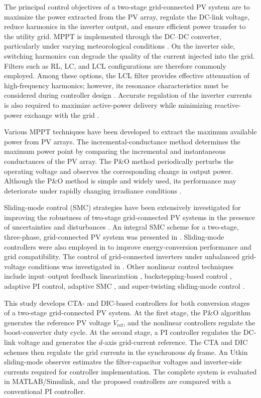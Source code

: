 \documentclass[preprint,12pt]{elsarticle}
\begin{document}
The principal control objectives of a two-stage grid-connected PV system are to maximize the power extracted from the PV array, regulate the DC-link voltage, reduce harmonics in the inverter output, and ensure efficient power transfer to the utility grid. MPPT is implemented through the DC--DC converter, particularly under varying meteorological conditions \cite{trujillo2016modeling}. On the inverter side, switching harmonics can degrade the quality of the current injected into the grid. Filters such as RL, LC, and LCL configurations are therefore commonly employed. Among these options, the LCL filter provides effective attenuation of high-frequency harmonics; however, its resonance characteristics must be considered during controller design \cite{li2023harmonic}. Accurate regulation of the inverter currents is also required to maximize active-power delivery while minimizing reactive-power exchange with the grid \cite{ahmed2022evaluation}.

Various MPPT techniques have been developed to extract the maximum available power from PV arrays. The incremental-conductance method determines the maximum power point by comparing the incremental and instantaneous conductances of the PV array. The P\&O method periodically perturbs the operating voltage and observes the corresponding change in output power. Although the P\&O method is simple and widely used, its performance may deteriorate under rapidly changing irradiance conditions \cite{soumana2022comparison}.

Sliding-mode control (SMC) strategies have been extensively investigated for improving the robustness of two-stage grid-connected PV systems in the presence of uncertainties and disturbances \cite{liu2022sliding,alnami2024enhanced}. An integral SMC scheme for a two-stage, three-phase, grid-connected PV system was presented in \cite{kihal2018robust}. Sliding-mode controllers were also employed in \cite{dash2022photovoltaic,kumar2015sliding} to improve energy-conversion performance and grid compatibility. The control of grid-connected inverters under unbalanced grid-voltage conditions was investigated in \cite{wu2022sliding}. Other nonlinear control techniques include input--output feedback linearization \cite{parvathy2020modelling}, backstepping-based control \cite{aouadi2018nonlinear,naddami2022nonlinear}, adaptive PI control, adaptive SMC \cite{zeb2021control}, and super-twisting sliding-mode control \cite{zeb2020design,dash2024robust}.

This study develops CTA- and DIC-based controllers for both conversion stages of a two-stage grid-connected PV system. At the first stage, the P\&O algorithm generates the reference PV voltage $V_{\mathrm{ref}}$, and the nonlinear controllers regulate the boost-converter duty cycle. At the second stage, a PI controller regulates the DC-link voltage and generates the $d$-axis grid-current reference. The CTA and DIC schemes then regulate the grid currents in the synchronous $dq$ frame. An Utkin sliding-mode observer estimates the filter-capacitor voltages and inverter-side currents required for controller implementation. The complete system is evaluated in MATLAB/Simulink, and the proposed controllers are compared with a conventional PI controller.
\end{document}
